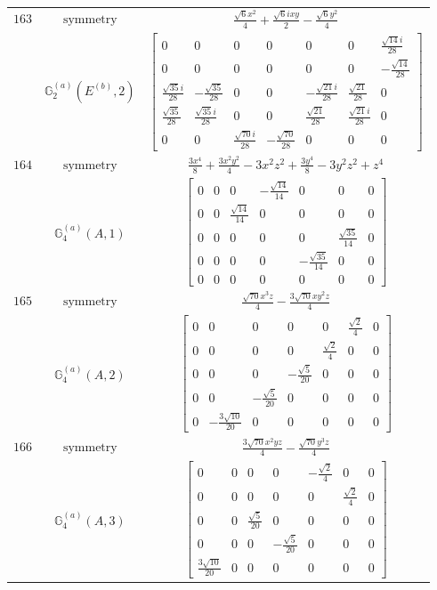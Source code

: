 \documentclass[fleqn,8pt,landscape]{jsarticle}
\begin{document}
\begin{longtable}{ccc}
$ 163 $ & $ \text{symmetry} $ & $ \frac{\sqrt{6} x^{2}}{4} + \frac{\sqrt{6} i x y}{2} - \frac{\sqrt{6} y^{2}}{4} $ \\
$  $ & $ \mathbb{G}_{2}^{(a)}(E^{(b)},2) $ & $ \begin{bmatrix} 0 & 0 & 0 & 0 & 0 & 0 & \frac{\sqrt{14} i}{28} \\ 0 & 0 & 0 & 0 & 0 & 0 & - \frac{\sqrt{14}}{28} \\ \frac{\sqrt{35} i}{28} & - \frac{\sqrt{35}}{28} & 0 & 0 & - \frac{\sqrt{21} i}{28} & \frac{\sqrt{21}}{28} & 0 \\ \frac{\sqrt{35}}{28} & \frac{\sqrt{35} i}{28} & 0 & 0 & \frac{\sqrt{21}}{28} & \frac{\sqrt{21} i}{28} & 0 \\ 0 & 0 & \frac{\sqrt{70} i}{28} & - \frac{\sqrt{70}}{28} & 0 & 0 & 0 \end{bmatrix} $ \\ \hline
$ 164 $ & $ \text{symmetry} $ & $ \frac{3 x^{4}}{8} + \frac{3 x^{2} y^{2}}{4} - 3 x^{2} z^{2} + \frac{3 y^{4}}{8} - 3 y^{2} z^{2} + z^{4} $ \\
$  $ & $ \mathbb{G}_{4}^{(a)}(A,1) $ & $ \begin{bmatrix} 0 & 0 & 0 & - \frac{\sqrt{14}}{14} & 0 & 0 & 0 \\ 0 & 0 & \frac{\sqrt{14}}{14} & 0 & 0 & 0 & 0 \\ 0 & 0 & 0 & 0 & 0 & \frac{\sqrt{35}}{14} & 0 \\ 0 & 0 & 0 & 0 & - \frac{\sqrt{35}}{14} & 0 & 0 \\ 0 & 0 & 0 & 0 & 0 & 0 & 0 \end{bmatrix} $ \\ \hline
$ 165 $ & $ \text{symmetry} $ & $ \frac{\sqrt{70} x^{3} z}{4} - \frac{3 \sqrt{70} x y^{2} z}{4} $ \\
$  $ & $ \mathbb{G}_{4}^{(a)}(A,2) $ & $ \begin{bmatrix} 0 & 0 & 0 & 0 & 0 & \frac{\sqrt{2}}{4} & 0 \\ 0 & 0 & 0 & 0 & \frac{\sqrt{2}}{4} & 0 & 0 \\ 0 & 0 & 0 & - \frac{\sqrt{5}}{20} & 0 & 0 & 0 \\ 0 & 0 & - \frac{\sqrt{5}}{20} & 0 & 0 & 0 & 0 \\ 0 & - \frac{3 \sqrt{10}}{20} & 0 & 0 & 0 & 0 & 0 \end{bmatrix} $ \\ \hline
$ 166 $ & $ \text{symmetry} $ & $ \frac{3 \sqrt{70} x^{2} y z}{4} - \frac{\sqrt{70} y^{3} z}{4} $ \\
$  $ & $ \mathbb{G}_{4}^{(a)}(A,3) $ & $ \begin{bmatrix} 0 & 0 & 0 & 0 & - \frac{\sqrt{2}}{4} & 0 & 0 \\ 0 & 0 & 0 & 0 & 0 & \frac{\sqrt{2}}{4} & 0 \\ 0 & 0 & \frac{\sqrt{5}}{20} & 0 & 0 & 0 & 0 \\ 0 & 0 & 0 & - \frac{\sqrt{5}}{20} & 0 & 0 & 0 \\ \frac{3 \sqrt{10}}{20} & 0 & 0 & 0 & 0 & 0 & 0 \end{bmatrix} $ \\ \hline

\end{longtable}
\end{document}
